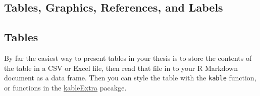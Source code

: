 \documentclass[twoside,12pt,final]{ucthesis-CA2012} %
\begin{document}
\begin{ucmainmatter}
{\chapter{Tables, Graphics, References, and Labels}\label{ref-labels}}

\hypertarget{tables}{%
\section{Tables}\label{tables}}

By far the easiest way to present tables in your thesis is to store the
contents of the table in a CSV or Excel file, then read that file in to
your R Markdown document as a data frame. Then you can style the table
with the \texttt{kable} function, or functions in the
\href{https://cran.r-project.org/web/packages/kableExtra/index.html}{kableExtra}
pacakge.


\end{ucmainmatter}
\end{document}
